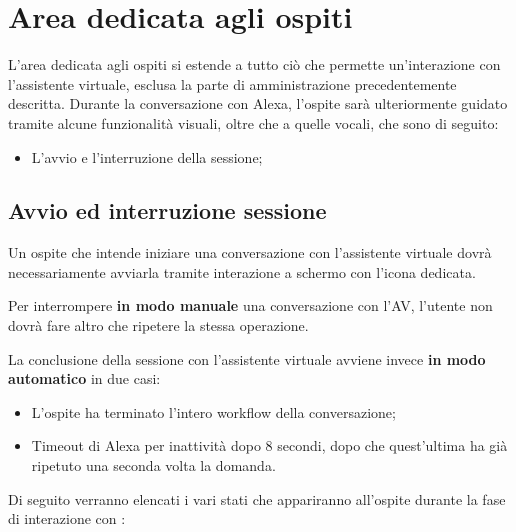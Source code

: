 \documentclass[../ManualeUtente_v2.0.0.tex]{subfiles}
\begin{document}
	\section{Area dedicata agli ospiti}
	\label{sub:GuestArea}
	L'area dedicata agli ospiti si estende a tutto ciò che permette un'interazione con l'assistente virtuale, esclusa la parte di amministrazione precedentemente descritta.
	Durante la conversazione con Alexa, l'ospite sarà ulteriormente guidato tramite alcune funzionalità visuali, oltre che a quelle vocali, che sono di seguito:

		\begin{itemize}
			\item L'avvio e l'interruzione della sessione;
		\end{itemize}

		\subsection{Avvio ed interruzione sessione}
		\label{sub:StartStopSession}
		Un ospite che intende iniziare una conversazione con l'assistente virtuale dovrà necessariamente avviarla tramite interazione a schermo con l'icona dedicata.

		Per interrompere \textbf{in modo manuale} una conversazione con l'AV, l'utente non dovrà fare altro che ripetere la stessa operazione.

		La conclusione della sessione con l'assistente virtuale avviene invece \textbf{in modo automatico} in due casi:
		\begin{itemize}
			\item L'ospite ha terminato l'intero \gls{workflow} della conversazione;
			\item Timeout di Alexa per inattività dopo 8 secondi, dopo che quest'ultima ha già ripetuto una seconda volta la domanda.
		\end{itemize}

		Di seguito verranno elencati i vari stati che appariranno all'ospite durante la fase di interazione con \atavi:
		
\end{document}
